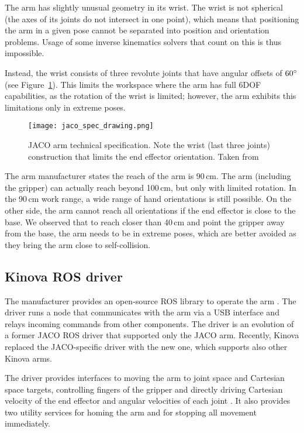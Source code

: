 \documentclass[buriama8_dp.tex]{subfiles}
\begin{document}
The arm has slightly unusual geometry in its wrist. The wrist is not spherical (the axes of its joints do not intersect in one point), which means that positioning the arm in a given pose cannot be separated into position and orientation problems. Usage of some inverse kinematics solvers that count on this is thus impossible.

Instead, the wrist consists of three revolute joints that have angular offsets of \(60^\circ\) (see Figure~\ref{fig:jaco_schema}). This limits the workspace where the arm has full 6DOF capabilities, as the rotation of the wrist is limited; however, the arm exhibits this limitations only in extreme poses.

\begin{figure}[ht]
  \centering
  \texttt{[image: jaco\_spec\_drawing.png]}
  \caption[JACO blueprint]{JACO arm technical specification. Note the wrist (last three joints) construction that limits the end effector orientation. Taken from \cite{jaco_spec}}
  \label{fig:jaco_schema}
\end{figure}

The arm manufacturer states the reach of the arm is 90\,cm. The arm (including the gripper) can actually reach beyond 100\,cm, but only with limited rotation. In the 90\,cm work range, a wide range of hand orientations is still possible. On the other side, the arm cannot reach all orientations if the end effector is close to the base. We observed that to reach closer than 40\,cm and point the gripper away from the base, the arm needs to be in extreme poses, which are better avoided as they bring the arm close to self-collision.

\subsection{Kinova ROS driver}
\label{subsec:kinova_ros}

The manufacturer provides an open-source ROS library to operate the arm \cite{kinova_ros}. The driver runs a node that communicates with the arm via a USB interface and relays incoming commands from other components. The driver is an evolution of a former JACO ROS driver that supported only the JACO arm. Recently, Kinova replaced the JACO-specific driver with the new one, which supports also other Kinova arms.

The driver provides interfaces to moving the arm to joint space and Cartesian space targets, controlling fingers of the gripper and directly driving Cartesian velocity of the end effector and angular velocities of each joint \cite{kinova_ros_api}. It also provides two utility services for homing the arm and for stopping all movement immediately.
\end{document}
